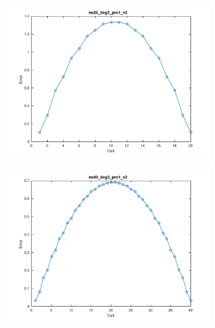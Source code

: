 \documentclass[11pt,a4paper]{article}
\theoremstyle{plain}
\theoremstyle{definition}
\begin{document}
\begin{figure}[H]
\begin{subfigure}[b]{0.48\textwidth}
\includegraphics[width=\linewidth]{../../tests_01_01/test_01_01_test9_pro1/output/plots/nc20_deg3_wei111_pro1_v2.pdf}
\end{subfigure}\hspace*{\fill}
\begin{subfigure}[b]{0.48\textwidth}
\includegraphics[width=\linewidth]{../../tests_01_01/test_01_01_test9_pro1/output/plots/nc40_deg3_wei111_pro1_v2.pdf}
\end{subfigure}


\end{figure}
\end{document}
